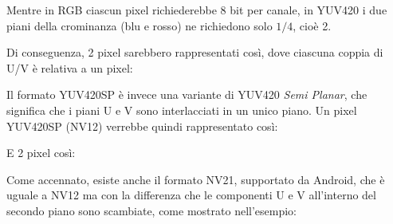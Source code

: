 
\begin{figure}[H]
\end{figure}

Mentre in RGB ciascun pixel richiederebbe 8 bit per canale, in YUV420 i due piani della crominanza (blu e rosso) ne richiedono solo $1/4$, cioè 2.

Di conseguenza, 2 pixel sarebbero rappresentati così, dove ciascuna coppia di U/V è relativa a un pixel:

\begin{figure}[H]
\end{figure}

Il formato YUV420SP è invece una variante di YUV420 \emph{Semi Planar}, che significa che i piani U e V sono interlacciati in un unico piano. Un pixel YUV420SP (NV12) verrebbe quindi rappresentato così:

\begin{figure}[H]
\end{figure}

E 2 pixel così:

\begin{figure}[H]
\end{figure}

Come accennato, esiste anche il formato NV21, supportato da Android, che è uguale a NV12 ma con la differenza che le componenti U e V all'interno del secondo piano sono scambiate, come mostrato nell'esempio:

